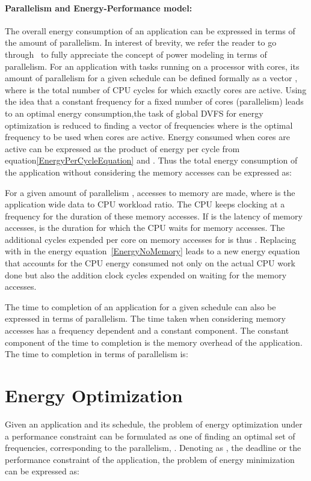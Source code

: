 \documentclass[11pt, letterpaper]{article}
\begin{document}
\paragraph{Parallelism and Energy-Performance model:}
 The overall energy consumption of an application can be expressed in terms of the amount of parallelism. In interest of brevity, we refer the reader to go through~\cite{ConvexAndScheduling} to fully appreciate the concept of power modeling in terms of parallelism. For an application with  tasks running on a processor with  cores, its amount of parallelism for a given schedule can be defined formally  as a vector , where  is the total number of CPU cycles for which exactly  cores are active. Using the idea that a constant frequency for a fixed number of cores (parallelism) leads to an optimal energy consumption,the task of global DVFS for energy optimization is reduced to finding a vector  of frequencies where  is the optimal frequency to be used when  cores are active. Energy consumed when  cores are active can be expressed as the product of energy per cycle  from equation\ref{EnergyPerCycleEquation} and .
 Thus the total energy consumption of the application without considering the memory accesses can be expressed as:
   
For a given amount of parallelism  ,  accesses to memory are made, where  is the application wide data to CPU workload ratio. The CPU keeps clocking at a frequency  for the duration of these  memory accesses. If  is the latency of memory accesses,  is the duration for which the CPU waits for memory accesses. The additional cycles expended per core on memory accesses for  is thus  . Replacing  with  in the energy equation~\ref{EnergyNoMemory} leads to a new energy equation that accounts for the CPU energy consumed not only on the actual CPU work done but also the addition clock cycles expended on waiting for the memory accesses. 

 
  The time to completion of an application for a given schedule can also be expressed in terms of parallelism. The time taken when considering memory accesses has a frequency dependent and a constant component. The constant component of the time to completion is the memory overhead of the application. The time to completion in terms of parallelism is:
  
 
\section{Energy Optimization}\label{EnergyOptimizationProblem}
Given an application and its schedule, the problem of energy optimization under a performance constraint can be formulated as one of finding an optimal set of frequencies,   corresponding to the parallelism, . Denoting as , the deadline or the performance constraint of the application, the problem of energy minimization can be expressed as: 
\end{document}
